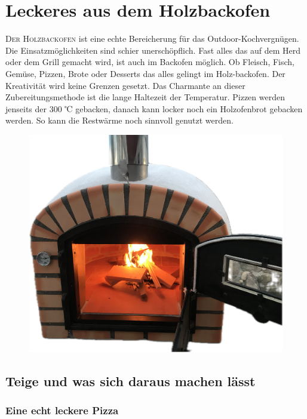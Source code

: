 \chapter{Leckeres aus dem Holzbackofen}\label{Chapter4}
\lettrine[lines=3]{D}{er Holzbackofen} ist eine echte Bereicherung für das 
Outdoor-Kochvergnügen.
Die Einsatzmöglichkeiten sind schier unerschöpflich. Fast alles das auf
dem Herd oder dem Grill gemacht wird, ist auch im Backofen möglich. Ob
Fleisch, Fisch, Gemüse, Pizzen, Brote oder Desserts das alles gelingt im 
Holz-backofen. Der Kreativität wird keine Grenzen gesetzt. Das Charmante an
dieser Zubereitungsmethode ist die lange Haltezeit der Temperatur. Pizzen
werden jenseits der 300 ℃ gebacken, danach kann locker noch ein 
Holzofenbrot gebacken werden. So kann die Restwärme noch sinnvoll genutzt
werden.

\begin{figure}[htbp]
	\centering
	\begin{minipage}{1\textwidth}
		\centering
		\includegraphics[width=.9\linewidth]{pics/Backofen}
		\label{fig:Backofen}
	\end{minipage}
\end{figure}
\newpage

\section{Teige und was sich daraus machen lässt}

\subsection{Eine echt leckere Pizza}

